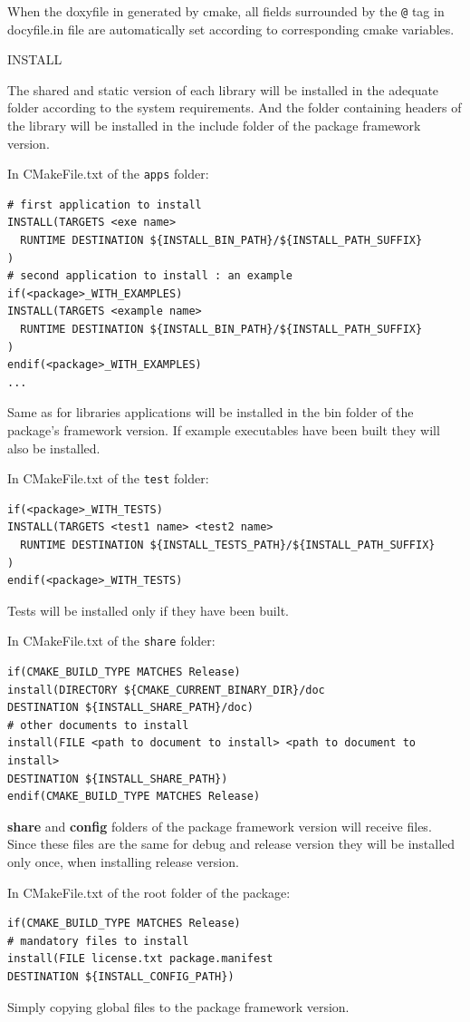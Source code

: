 \documentclass[12pt,a4paper]{article}
\begin{document}
When the doxyfile in generated by cmake, all fields surrounded by the \verb|@| tag in docyfile.in file are automatically set according to corresponding cmake variables.

INSTALL 

The shared and static version of each library will be installed in the adequate folder according to the system requirements. And the folder containing headers of the library will be installed in the include folder of the package framework version.

In CMakeFile.txt of the \texttt{apps} folder:
\begin{verbatim}
# first application to install
INSTALL(TARGETS <exe name>
  RUNTIME DESTINATION ${INSTALL_BIN_PATH}/${INSTALL_PATH_SUFFIX}
)
# second application to install : an example
if(<package>_WITH_EXAMPLES)
INSTALL(TARGETS <example name>
  RUNTIME DESTINATION ${INSTALL_BIN_PATH}/${INSTALL_PATH_SUFFIX}
)
endif(<package>_WITH_EXAMPLES)
...
\end{verbatim}
Same as for libraries applications will be installed in the bin folder of the package's framework version. If example executables have been built they will also be installed.


In CMakeFile.txt of the \texttt{test} folder:
\begin{verbatim}
if(<package>_WITH_TESTS)
INSTALL(TARGETS <test1 name> <test2 name>
  RUNTIME DESTINATION ${INSTALL_TESTS_PATH}/${INSTALL_PATH_SUFFIX}
)
endif(<package>_WITH_TESTS)
\end{verbatim}
Tests will be installed only if they have been built.

In CMakeFile.txt of the \texttt{share} folder:
\begin{verbatim}
if(CMAKE_BUILD_TYPE MATCHES Release)
install(DIRECTORY ${CMAKE_CURRENT_BINARY_DIR}/doc 
DESTINATION ${INSTALL_SHARE_PATH}/doc)
# other documents to install
install(FILE <path to document to install> <path to document to install>
DESTINATION ${INSTALL_SHARE_PATH})
endif(CMAKE_BUILD_TYPE MATCHES Release)
\end{verbatim}

\textbf{share} and \textbf{config} folders of the package framework version will receive files. Since these files are the same for debug and release version they will be installed only once, when installing release version.

In CMakeFile.txt of the root folder of the package:
\begin{verbatim}
if(CMAKE_BUILD_TYPE MATCHES Release)
# mandatory files to install
install(FILE license.txt package.manifest
DESTINATION ${INSTALL_CONFIG_PATH})
\end{verbatim}
Simply copying global files to the package framework version.
\end{document}
